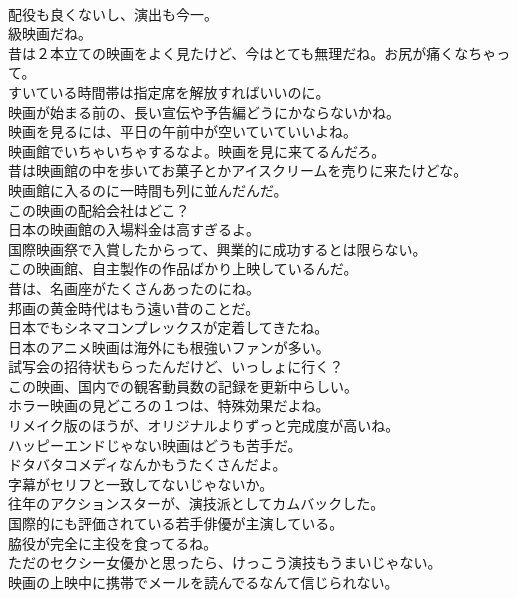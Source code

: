 \documentclass[8pt]{extreport}
\begin{document}
\begin{CJK}{UTF8}{min}
\\	配役も良くないし、演出も今一。
\\	級映画だね。	
\\	昔は２本立ての映画をよく見たけど、今はとても無理だね。お尻が痛くなちゃって。	
\\	すいている時間帯は指定席を解放すればいいのに。	
\\	映画が始まる前の、長い宣伝や予告編どうにかならないかね。	
\\	映画を見るには、平日の午前中が空いていていいよね。	
\\	映画館でいちゃいちゃするなよ。映画を見に来てるんだろ。	
\\	昔は映画館の中を歩いてお菓子とかアイスクリームを売りに来たけどな。	
\\	映画館に入るのに一時間も列に並んだんだ。	
\\	この映画の配給会社はどこ？	
\\	日本の映画館の入場料金は高すぎるよ。	
\\	国際映画祭で入賞したからって、興業的に成功するとは限らない。	
\\	この映画館、自主製作の作品ばかり上映しているんだ。	
\\	昔は、名画座がたくさんあったのにね。	
\\	邦画の黄金時代はもう遠い昔のことだ。	
\\	日本でもシネマコンプレックスが定着してきたね。	
\\	日本のアニメ映画は海外にも根強いファンが多い。	
\\	試写会の招待状もらったんだけど、いっしょに行く？	
\\	この映画、国内での観客動員数の記録を更新中らしい。	
\\	ホラー映画の見どころの１つは、特殊効果だよね。	
\\	リメイク版のほうが、オリジナルよりずっと完成度が高いね。	
\\	ハッピーエンドじゃない映画はどうも苦手だ。	
\\	ドタバタコメディなんかもうたくさんだよ。	
\\	字幕がセリフと一致してないじゃないか。	
\\	往年のアクションスターが、演技派としてカムバックした。	
\\	国際的にも評価されている若手俳優が主演している。	
\\	脇役が完全に主役を食ってるね。	
\\	ただのセクシー女優かと思ったら、けっこう演技もうまいじゃない。	
\\	映画の上映中に携帯でメールを読んでるなんて信じられない。	

\end{CJK}
\end{document}
